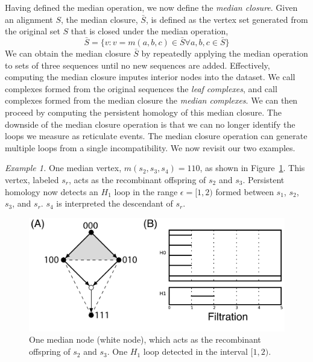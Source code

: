 Having defined the median operation, we now define the \emph{median closure}.
Given an alignment $S$, the median closure, $\bar{S}$, is defined as the vertex set generated from the original set $S$ that is closed under the median operation,
\begin{equation}
\bar{S} = \{v \colon v=m(a,b,c) \in \bar{S} \forall a,b,c \in \bar{S}\}
\end{equation}
We can obtain the median closure $\bar{S}$ by repeatedly applying the median operation to sets of three sequences until no new sequences are added.
Effectively, computing the median closure imputes interior nodes into the dataset.
We call complexes formed from the original sequences the \emph{leaf complexes}, and call complexes formed from the median closure the \emph{median complexes}.
We can then proceed by computing the persistent homology of this median closure.
The downside of the median closure operation is that we can no longer identify the loops we measure as reticulate events.
The median closure operation can generate multiple loops from a single incompatibility.
We now revisit our two examples.

\emph{Example 1.}
One median vertex, $m(s_2,s_3,s_4)=110$, as shown in Figure~\ref{fig:example_1_revisited}.
This vertex, labeled $s_r$, acts as the recombinant offspring of $s_2$ and $s_3$.
Persistent homology now detects an $H_{1}$ loop in the range $\epsilon=[1,2)$ formed between $s_1$, $s_2$, $s_3$, and $s_r$.
$s_4$ is interpreted the descendant of $s_r$.

\begin{figure}
\centering
\includegraphics[width=\columnwidth]{fig/complex_construction/example_1_revisited.pdf}
\caption[The Median Complex Recovers Reticulation in Example One]{One median node (white node), which acts as the recombinant offspring of $s_2$ and $s_3$. One $H_1$ loop detected in the interval $[1,2)$.}
\label{fig:example_1_revisited}
\end{figure}

